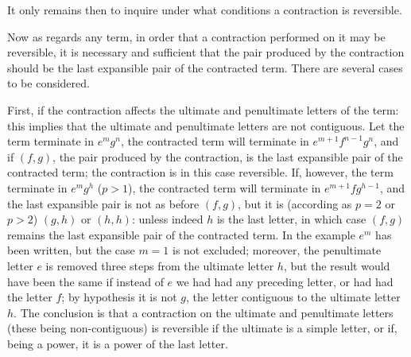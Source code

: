 \documentclass[11pt,a4paper]{book}
\begin{document}
It only remains then to inquire under what conditions a contraction is reversible.

Now as regards any term, in order that a contraction performed on it may be reversible, it is necessary and sufficient that the pair produced by the contraction should be the last expansible pair of the contracted term. There are several cases to be considered.

First, if the contraction affects the ultimate and penultimate letters of the term: this implies that the ultimate and penultimate letters are not contiguous. Let the term terminate in $e^mg^n$, the contracted term will terminate in $e^{m+1}f^{n-1}g^n$, and if $(f,g)$, the pair produced by the contraction, is the last expansible pair of the contracted term; the contraction is in this case reversible. If, however, the term terminate in $e^mg^h$ ($p>1$), the contracted term will terminate in $e^{m+1}fg^{h-1}$, and the last expansible pair is not as before $(f,g)$, but it is (according as $p=2$ or $p>2$) $(g,h)$ or $(h,h)$: unless indeed $h$ is the last letter, in which case $(f,g)$ remains the last expansible pair of the contracted term. In the example $e^m$ has been written, but the case $m=1$ is not excluded; moreover, the penultimate letter $e$ is removed three steps from the ultimate letter $h$, but the result would have been the same if instead of $e$ we had had any preceding letter, or had had the letter $f$; by hypothesis it is not $g$, the letter contiguous to the ultimate letter $h$. The conclusion is that a contraction on the ultimate and penultimate letters (these being non-contiguous) is reversible if the ultimate is a simple letter, or if, being a power, it is a power of the last letter.
\end{document}

